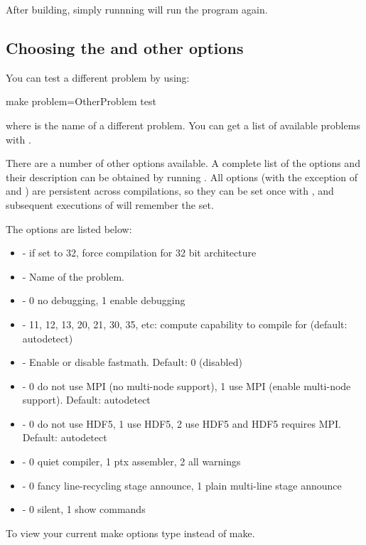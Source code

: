 \documentclass[12pt]{memoir}
\begin{document}
After building, simply runnning  will run the program
again.


\subsection{Choosing the  and other options}

You can test a different problem by using:
\begin{shellcode}
make problem=OtherProblem test
\end{shellcode}
where  is the name of a different problem. You can get
a list of available problems with .

There are a number of other options available. A complete list of the
options and their description can be obtained by running . All options (with the exception of  and
) are persistent across compilations, so they can be set once
with , and subsequent executions of 
will remember the  set.

The  options are listed below:
\begin{itemize}
\item {} - if set to 32, force compilation for 32 bit architecture
\item {} - Name of the problem.
\item {} - 0 no debugging, 1 enable debugging
\item {} - 11, 12, 13, 20, 21, 30, 35, etc: compute capability to compile for (default: autodetect)
\item {} - Enable or disable fastmath. Default: 0 (disabled)
\item {} - 0 do not use MPI (no multi-node support), 1 use MPI (enable multi-node support). Default: autodetect
\item {} - 0 do not use HDF5, 1 use HDF5, 2 use HDF5 and HDF5 requires MPI. Default: autodetect
\item {} - 0 quiet compiler, 1 ptx assembler, 2 all warnings
\item {} - 0 fancy line-recycling stage announce, 1 plain multi-line stage announce
\item {} - 0 silent, 1 show commands
\end{itemize}
To view your current make options type  instead of make.
\end{document}
